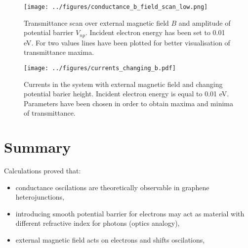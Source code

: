 \documentclass{beamer}
\begin{document}
\begin{frame}
    \begin{figure}
        \begin{center}
            \texttt{[image: ../figures/conductance\_b\_field\_scan\_low.png]}
        \end{center}
        \caption{Transmittance scan over external magnetic field $B$ and amplitude of potential barrier $V_{np}$. Incident electron energy has been set to 0.01 eV. For two values lines have been plotted for better visualisation of transmittance maxima.}
    \end{figure}
\end{frame}

\begin{frame}
    \begin{figure}
        \begin{center}
            \texttt{[image: ../figures/currents\_changing\_b.pdf]}
        \end{center}
        \caption{Currents in the system with external magnetic field and changing potential barier height. Incident electron energy is equal to 0.01 eV. Parameters have been chosen in order to obtain maxima and minima of transmittance.}
    \end{figure}
\end{frame}

\section{Summary}

\begin{frame}
    Calculations proved that:
    \begin{itemize}
        \item conductance oscilations are theoretically observable in graphene heterojunctions, 
        \item introducing smooth potential barrier for electrons may act as material with different refractive index for photons (optics analogy),
        \item external magnetic field acts on electrons and shifts oscilations,
    \end{itemize}
\end{frame}

\frame{\titlepage}
\end{document}
